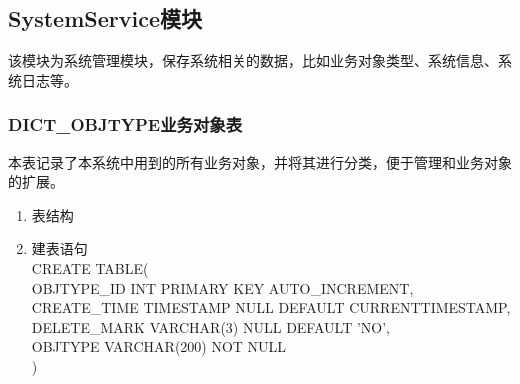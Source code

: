 \subsection{SystemService模块}
该模块为系统管理模块，保存系统相关的数据，比如业务对象类型、系统信息、系统日志等。
\subsubsection{DICT\_OBJTYPE业务对象表}
本表记录了本系统中用到的所有业务对象，并将其进行分类，便于管理和业务对象的扩展。
\begin{enumerate}
    \item 表结构
    \begin{table}[htbp]
        \centering
        \end{table}
    \item 建表语句\\
        CREATE TABLE(\\
            OBJTYPE\_ID INT PRIMARY KEY AUTO\_INCREMENT,\\
            CREATE\_TIME TIMESTAMP NULL DEFAULT CURRENTTIMESTAMP,\\
            DELETE\_MARK VARCHAR(3) NULL DEFAULT 'NO',\\
            OBJTYPE VARCHAR(200) NOT NULL \\
        )
    \end{enumerate}

